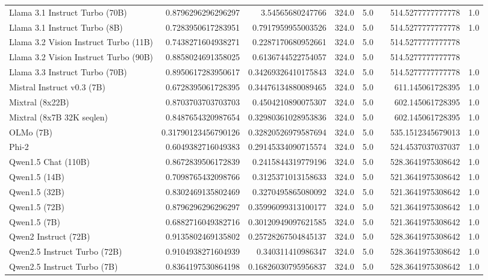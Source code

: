 \begin{table}[htp]
{\begin{tabular}{lrrrrrrr}
Llama 3.1 Instruct Turbo (70B) & 0.8796296296296297 & 3.54565680247766 & 324.0 & 5.0 &  & 514.5277777777778 & 1.0 \\
Llama 3.1 Instruct Turbo (8B) & 0.7283950617283951 & 0.7917959955003526 & 324.0 & 5.0 &  & 514.5277777777778 & 1.0 \\
Llama 3.2 Vision Instruct Turbo (11B) & 0.7438271604938271 & 0.2287170680952661 & 324.0 & 5.0 &  & 514.5277777777778 &  \\
Llama 3.2 Vision Instruct Turbo (90B) & 0.8858024691358025 & 0.6136744522754057 & 324.0 & 5.0 &  & 514.5277777777778 &  \\
Llama 3.3 Instruct Turbo (70B) & 0.8950617283950617 & 0.34269326410175843 & 324.0 & 5.0 &  & 514.5277777777778 & 1.0 \\
Mistral Instruct v0.3 (7B) & 0.6728395061728395 & 0.34476134880089465 & 324.0 & 5.0 &  & 611.145061728395 & 1.0 \\
Mixtral (8x22B) & 0.8703703703703703 & 0.4504210890075307 & 324.0 & 5.0 &  & 602.145061728395 & 1.0 \\
Mixtral (8x7B 32K seqlen) & 0.8487654320987654 & 0.32980361028953836 & 324.0 & 5.0 &  & 602.145061728395 & 1.0 \\
OLMo (7B) & 0.31790123456790126 & 0.32820526979587694 & 324.0 & 5.0 &  & 535.1512345679013 & 1.0 \\
Phi-2 & 0.6049382716049383 & 0.29145334090715574 & 324.0 & 5.0 &  & 524.4537037037037 & 1.0 \\
Qwen1.5 Chat (110B) & 0.8672839506172839 & 0.2415844319779196 & 324.0 & 5.0 &  & 528.3641975308642 & 1.0 \\
Qwen1.5 (14B) & 0.7098765432098766 & 0.3125371013158633 & 324.0 & 5.0 &  & 521.3641975308642 & 1.0 \\
Qwen1.5 (32B) & 0.8302469135802469 & 0.3270495865080092 & 324.0 & 5.0 &  & 521.3641975308642 & 1.0 \\
Qwen1.5 (72B) & 0.8796296296296297 & 0.35996099313100177 & 324.0 & 5.0 &  & 521.3641975308642 & 1.0 \\
Qwen1.5 (7B) & 0.6882716049382716 & 0.30120949097621585 & 324.0 & 5.0 &  & 521.3641975308642 & 1.0 \\
Qwen2 Instruct (72B) & 0.9135802469135802 & 0.25728267504845137 & 324.0 & 5.0 &  & 528.3641975308642 & 1.0 \\
Qwen2.5 Instruct Turbo (72B) & 0.9104938271604939 & 0.340311410986347 & 324.0 & 5.0 &  & 528.3641975308642 & 1.0 \\
Qwen2.5 Instruct Turbo (7B) & 0.8364197530864198 & 0.16826030795956837 & 324.0 & 5.0 &  & 528.3641975308642 & 1.0 \\

\end{tabular}}
\end{table}
